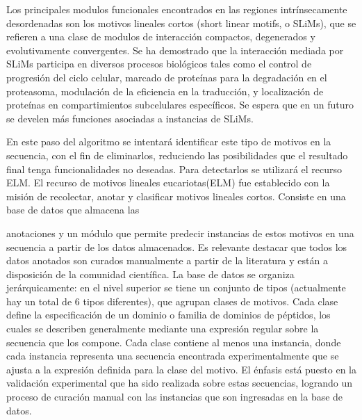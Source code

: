 Los principales modulos funcionales encontrados en las regiones intrínsecamente desordenadas son los motivos lineales cortos (short linear motifs, o SLiMs), que se refieren a una clase de modulos de interacción compactos, degenerados y evolutivamente convergentes.
Se ha demostrado que la interacción mediada por SLiMs participa en diversos procesos biológicos tales como el control de progresión del ciclo celular, marcado de proteínas para la degradación en el proteasoma, modulación de la eficiencia en la traducción, y localización de proteínas en compartimientos subcelulares específicos. Se espera que en un futuro se develen más funciones asociadas a instancias de SLiMs.


En este paso del algoritmo se intentará identificar este tipo de motivos en la secuencia, con el fin de eliminarlos, reduciendo las posibilidades que el resultado final tenga funcionalidades no deseadas. Para detectarlos se utilizará el recurso ELM.
El recurso de motivos lineales eucariotas(ELM) \cite{puntervoll2003elm,dinkel2013eukaryotic} fue establecido con la misión de recolectar, anotar y clasificar motivos lineales cortos. Consiste en una base de datos que almacena las 

anotaciones y un módulo que permite predecir instancias de estos motivos en una secuencia a partir de los datos almacenados. Es relevante destacar que todos los datos anotados son curados manualmente a partir de la literatura y están a disposición de la comunidad científica.
La base de datos se organiza jerárquicamente: en el nivel superior se tiene un conjunto de tipos (actualmente hay un total de 6 tipos diferentes), que agrupan clases de motivos. Cada clase define la especificación de un dominio o familia de dominios de péptidos, los cuales se describen generalmente mediante una expresión regular sobre la secuencia que los compone. Cada clase contiene al menos una instancia, donde cada instancia representa una secuencia encontrada experimentalmente que se ajusta a la expresión definida para la clase del motivo.
El énfasis está puesto en la validación experimental que ha sido realizada sobre estas secuencias, logrando un proceso de curación manual con las instancias que son ingresadas en la base de datos. 

